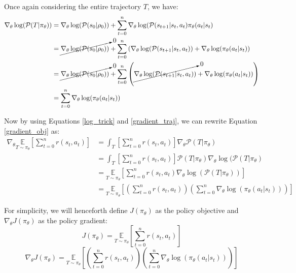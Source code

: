 \documentclass{article} %
\begin{document}
Once again considering the entire trajectory $T$, we have:
\begin{equation} \label{gradient_traj}
    \begin{aligned}
        \nabla_\theta \log(\mathcal{P}(T | \pi_\theta)) & = \nabla_\theta \log(\mathcal{P}(s_0 | \rho_0)) + \sum_{t=0}^{n} \nabla_\theta \log(\mathcal{P}(s_{t + 1} | s_t, a_t) \pi_\theta(a_t | s_t) \\
        & = \cancelto{0}{\nabla_\theta \log(\mathcal{P}(s_0 | \rho_0))} + \sum_{t=0}^{n} \left( \nabla_\theta \log(\mathcal{P}(s_{t + 1} | s_t, a_t)) + \nabla_\theta \log(\pi_\theta(a_t | s_t) \right)\\
        & = \cancelto{0}{\nabla_\theta \log(\mathcal{P}(s_0 | \rho_0))} + \sum_{t=0}^{n} \left( \cancelto{0}{\nabla_\theta \log(\mathcal{P}(s_{t + 1} | s_t, a_t))} + \nabla_\theta \log(\pi_\theta(a_t | s_t)) \right)\\
        & = \sum_{t=0}^{n} \nabla_\theta \log(\pi_\theta(a_t | s_t)) \\
    \end{aligned}
\end{equation}

Now by using Equations \eqref{log_trick} and \eqref{gradient_traj}, we can rewrite Equation \eqref{gradient_obj} as:
\begin{equation} \label{gradient_obj_rewritten}
    \begin{aligned}
    \nabla_\theta \underset{T \sim \pi_\theta}{\mathbb{E}} \left[ \sum_{t=0}^{n} r(s_t, a_t) \right] 
        &= \int_{T} \left[\sum_{t=0}^{n} r(s_t, a_t) \right] \nabla_\theta \mathcal{P}(T | \pi_\theta) \\
        &= \int_{T} \left[\sum_{t=0}^{n} r(s_t, a_t) \right] \mathcal{P}(T | \pi_\theta) \nabla_\theta \log(\mathcal{P}(T | \pi_\theta) \\
        &= \underset{T \sim \pi_\theta}{\mathbb{E}} \left[ \sum_{t=0}^{n} r(s_t, a_t) \nabla_\theta \log(\mathcal{P}(T | \pi_\theta)) \right] \\
        &= \underset{T \sim \pi_\theta}{\mathbb{E}} \left[ \left(\sum_{t=0}^{n} r(s_t, a_t)\right) \left( \sum_{t=0}^{n} \nabla_\theta \log(\pi_\theta(a_t | s_t)) \right) \right]
    \end{aligned}
\end{equation}

For simplicity, we will henceforth define $J(\pi_\theta)$ as the policy objective and $\nabla_\theta J(\pi_\theta)$ as the policy gradient:
\begin{equation} \label{policy_objective}
    J(\pi_\theta) = \underset{T \sim \pi_\theta}{\mathbb{E}} \left[ \sum_{t=0}^{n} r(s_t, a_t) \right]
\end{equation}
\begin{equation} \label{policy_gradient}
    \nabla_\theta J(\pi_\theta) = \underset{T \sim \pi_\theta}{\mathbb{E}} \left[ \left(\sum_{t=0}^{n} r(s_t, a_t)\right) \left( \sum_{t=0}^{n} \nabla_\theta \log(\pi_\theta(a_t | s_t)) \right) \right]
\end{equation}
\end{document}
